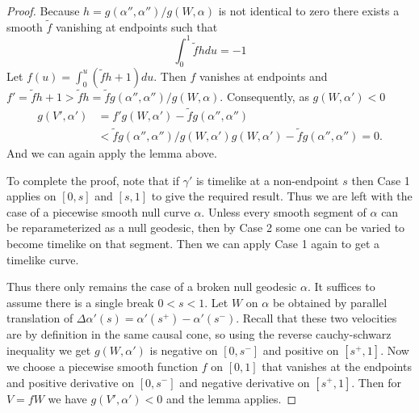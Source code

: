 \begin{proof}
Because $h=g(\alpha'',\alpha'')/g(W,\alpha)$ is not identical to zero there exists a smooth $\widetilde{f}$ vanishing at endpoints such that 
\[
    \int_0^1\widetilde{f}hdu = -1
\]
Let $f(u) = \int_0^u(\widetilde{f}h+1)du$. Then $f$ vanishes at endpoints and $f'=\widetilde{f}h+1 > \widetilde{f}h = \widetilde{f}g(\alpha'',\alpha'')/g(W,\alpha)$.
Consequently, as $g(W,\alpha')<0$
\begin{align*}
    g(V',\alpha') &= f'g(W,\alpha') - \widetilde{f}g(\alpha'',\alpha'') \\
    &< \widetilde{f}g(\alpha'',\alpha'')/g(W,\alpha')g(W,\alpha') - \widetilde{f}g(\alpha'',\alpha'') = 0.
\end{align*}
And we can again apply the lemma above.

To complete the proof, note that if $\gamma'$ is timelike at a non-endpoint $s$ then Case 1 applies on $[0,s]$ and $[s,1]$ to give the required result. Thus we are left with the case of a piecewise smooth null curve $\alpha$. Unless every smooth segment of $\alpha$ can be reparameterized as a null geodesic, then by Case 2 some one can be varied to become timelike on that segment. Then we can apply Case 1 again to get a timelike curve.

Thus there only remains the case of a broken null geodesic $\alpha$. It suffices to assume there is a single break $0<s<1$. Let $W$ on $\alpha$ be obtained by parallel translation of $\Delta\alpha'(s) = \alpha'(s^+)-\alpha'(s^-)$. Recall that these two velocities are by definition in the same causal cone, so using the reverse cauchy-schwarz inequality we get $g(W,\alpha')$ is negative on $[0,s^-]$ and positive on $[s^+,1]$. Now we choose a piecewise smooth function $f$ on $[0,1]$ that vanishes at the endpoints and positive derivative on $[0,s^-]$ and negative derivative on $[s^+,1]$. Then for $V=fW$ we have $g(V',\alpha')<0$ and the lemma applies.
\end{proof}